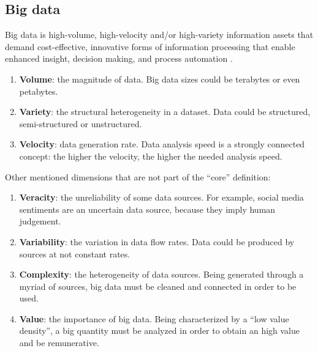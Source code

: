 \documentclass[\main/main.tex]{subfiles}
\begin{document}
\subsection{Big data}
Big data \cite{Gandomi2015BeyondTH} is high-volume, high-velocity and/or high-variety information assets that demand cost-effective, innovative forms of information processing that enable enhanced insight, decision making, and process automation \cite{bigdatagartner}.
\begin{enumerate}
    \item \textbf{Volume}: the magnitude of data. Big data sizes could be terabytes or even petabytes.
    \item \textbf{Variety}: the structural heterogeneity in a dataset. Data could be structured, semi-structured or unstructured.
    \item \textbf{Velocity}: data generation rate. Data analysis speed is a strongly connected concept: the higher the velocity, the higher the needed analysis speed.
\end{enumerate}
Other mentioned dimensions that are not part of the ``core'' definition:
\begin{enumerate}
    \item \textbf{Veracity}: the unreliability of some data sources. For example, social media sentiments are an uncertain data source, because they imply human judgement.
    \item \textbf{Variability}: the variation in data flow rates. Data could be produced by sources at not constant rates.
    \item \textbf{Complexity}: the heterogeneity of data sources. Being generated through a myriad of sources, big data must be cleaned and connected in order to be used.
    \item \textbf{Value}: the importance of big data. Being characterized by a ``low value density'', a big quantity must be analyzed in order to obtain an high value and be remunerative.
\end{enumerate}
\end{document}
